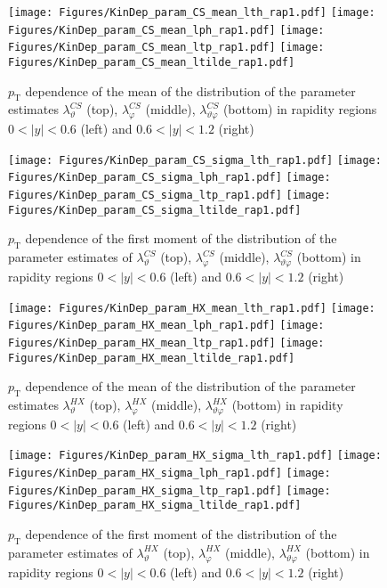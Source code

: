 \documentclass[12pt]{article}
\newcommand{\pT}{p_\mathrm{T}}
\newcommand{\absy}{\left |  y \right |}
\newcommand{\lamthCS}{\lambda^{\scriptscriptstyle CS}_\vartheta}
\newcommand{\lamphCS}{\lambda^{\scriptscriptstyle CS}_\varphi}
\newcommand{\lamthphCS}{\lambda^{\scriptscriptstyle CS}_{\vartheta \varphi}}
\newcommand{\lamthHX}{\lambda^{\scriptscriptstyle HX}_\vartheta}
\newcommand{\lamphHX}{\lambda^{\scriptscriptstyle HX}_\varphi}
\newcommand{\lamthphHX}{\lambda^{\scriptscriptstyle HX}_{\vartheta \varphi}}
\begin{document}



\begin{figure}[htbp]
\centering
\texttt{[image: Figures/KinDep\_param\_CS\_mean\_lth\_rap1.pdf]}
\texttt{[image: Figures/KinDep\_param\_CS\_mean\_lph\_rap1.pdf]}
\texttt{[image: Figures/KinDep\_param\_CS\_mean\_ltp\_rap1.pdf]}
\texttt{[image: Figures/KinDep\_param\_CS\_mean\_ltilde\_rap1.pdf]}
\caption{$\pT$ dependence of the mean of the distribution of the parameter estimates $\lamthCS$ (top), $\lamphCS$ (middle), $\lamthphCS$ (bottom) in rapidity regions $0<\absy<0.6$ (left) and $0.6<\absy<1.2$ (right)}
\end{figure}
\clearpage


\begin{figure}[htbp]
\centering
\texttt{[image: Figures/KinDep\_param\_CS\_sigma\_lth\_rap1.pdf]}
\texttt{[image: Figures/KinDep\_param\_CS\_sigma\_lph\_rap1.pdf]}
\texttt{[image: Figures/KinDep\_param\_CS\_sigma\_ltp\_rap1.pdf]}
\texttt{[image: Figures/KinDep\_param\_CS\_sigma\_ltilde\_rap1.pdf]}
\caption{$\pT$ dependence of the first moment of the distribution of the parameter estimates of $\lamthCS$ (top), $\lamphCS$ (middle), $\lamthphCS$ (bottom) in rapidity regions $0<\absy<0.6$ (left) and $0.6<\absy<1.2$ (right)}
\end{figure}
\clearpage




\begin{figure}[htbp]
\centering
\texttt{[image: Figures/KinDep\_param\_HX\_mean\_lth\_rap1.pdf]}
\texttt{[image: Figures/KinDep\_param\_HX\_mean\_lph\_rap1.pdf]}
\texttt{[image: Figures/KinDep\_param\_HX\_mean\_ltp\_rap1.pdf]}
\texttt{[image: Figures/KinDep\_param\_HX\_mean\_ltilde\_rap1.pdf]}
\caption{$\pT$ dependence of the mean of the distribution of the parameter estimates $\lamthHX$ (top), $\lamphHX$ (middle), $\lamthphHX$ (bottom) in rapidity regions $0<\absy<0.6$ (left) and $0.6<\absy<1.2$ (right)}
\end{figure}
\clearpage



\begin{figure}[htbp]
\centering
\texttt{[image: Figures/KinDep\_param\_HX\_sigma\_lth\_rap1.pdf]}
\texttt{[image: Figures/KinDep\_param\_HX\_sigma\_lph\_rap1.pdf]}
\texttt{[image: Figures/KinDep\_param\_HX\_sigma\_ltp\_rap1.pdf]}
\texttt{[image: Figures/KinDep\_param\_HX\_sigma\_ltilde\_rap1.pdf]}
\caption{$\pT$ dependence of the first moment of the distribution of the parameter estimates of $\lamthHX$ (top), $\lamphHX$ (middle), $\lamthphHX$ (bottom) in rapidity regions $0<\absy<0.6$ (left) and $0.6<\absy<1.2$ (right)}
\end{figure}
\clearpage
\end{document}
